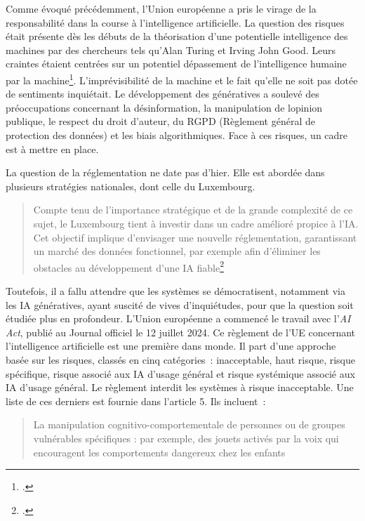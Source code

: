 Comme évoqué précédemment, l'Union européenne a pris le virage de la
responsabilité dans la course à l'intelligence artificielle. La question
des risques était présente dès les débuts de la théorisation d'une
potentielle intelligence des machines par des chercheurs tels qu'Alan Turing et Irving John Good. Leurs craintes étaient centrées sur un potentiel dépassement de
l'intelligence humaine par la machine\footcite{beard_9_2023}. L'imprévisibilité de
la machine et le fait qu'elle ne soit pas dotée de sentiments
inquiétait. Le développement des \gls{générative}s a soulevé des
préoccupations concernant la désinformation, la manipulation de
l\textquotesingle opinion publique, le respect du droit d'auteur, du
RGPD (Règlement général de protection des données) et les biais
algorithmiques. Face à ces risques, un cadre est à mettre en place. 

La question de la réglementation ne date pas d'hier. Elle est abordée dans
plusieurs stratégies nationales, dont celle du Luxembourg.

\begin{quote}
	Compte tenu de l'importance stratégique et de la grande complexité de ce
	sujet, le Luxembourg tient à investir dans un cadre amélioré propice à
	l'IA. Cet objectif implique d'envisager une nouvelle réglementation,
	garantissant un marché des données fonctionnel, par exemple afin
	d'éliminer les obstacles au développement d'une IA fiable\footcite{noauthor_intelligence_2019}
\end{quote}

Toutefois, il a fallu attendre que les systèmes se démocratisent,
notamment via les IA génératives, ayant suscité de vives d'inquiétudes,
pour que la question soit étudiée plus en profondeur. L'Union européenne
a commencé le travail avec l'\emph{AI Act}, publié au Journal officiel
le 12 juillet 2024. Ce règlement de l'UE concernant l'intelligence
artificielle est une première dans monde. Il part d'une approche basée
sur les risques, classés en cinq catégories~: inacceptable, haut risque,
risque spécifique, risque associé aux IA d'usage général et risque
systémique associé aux IA d'usage général. Le règlement interdit les
systèmes à risque inacceptable. Une liste de ces derniers est fournie
dans l'article 5. Ils incluent~:

	\begin{quote}
		La manipulation cognitivo-comportementale de personnes ou de groupes
		vulnérables spécifiques : par exemple, des jouets activés par la voix
		qui encouragent les comportements dangereux chez les enfants
	\end{quote}

